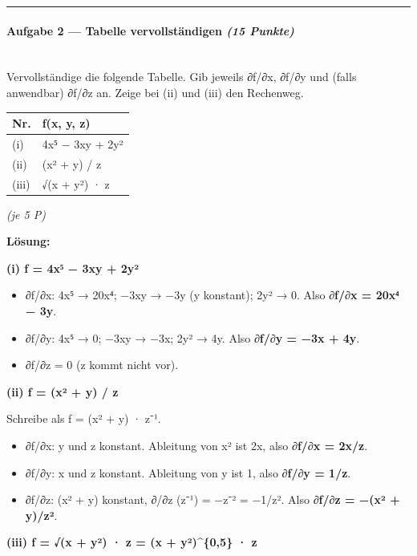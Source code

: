 \documentclass[11pt, a4paper]{article}
\begin{document}
\noindent\textcolor{rulegray}{\rule{\linewidth}{0.4pt}}


\paragraph{Aufgabe 2 — Tabelle vervollständigen \textit{(15 Punkte)}}\mbox{}\\[2pt]

Vervollständige die folgende Tabelle. Gib jeweils ∂f/∂x, ∂f/∂y und (falls anwendbar) ∂f/∂z an. Zeige bei (ii) und (iii) den Rechenweg.



{\small
\begin{tabularx}{\linewidth}{XX}
\hline
\rowcolor{tableheadbg}
{\color{white}\textbf{Nr.}} & {\color{white}\textbf{f(x, y, z)}} \\[2pt]
\hline
\endhead
\hline
\endfoot
(i) & 4x⁵ − 3xy + 2y² \\
(ii) & (x² + y) / z \\
(iii) & √(x + y²) · z \\
\end{tabularx}
}


\textit{(je 5 P)}


\textbf{Lösung:}


\textbf{(i) f = 4x⁵ − 3xy + 2y²}


\begin{itemize}
  \item ∂f/∂x: 4x⁵ → 20x⁴; −3xy → −3y (y konstant); 2y² → 0. Also \textbf{∂f/∂x = 20x⁴ − 3y}.
  \item ∂f/∂y: 4x⁵ → 0; −3xy → −3x; 2y² → 4y. Also \textbf{∂f/∂y = −3x + 4y}.
  \item ∂f/∂z = 0 (z kommt nicht vor).
\end{itemize}

\textbf{(ii) f = (x² + y) / z}


Schreibe als f = (x² + y) · z⁻¹.


\begin{itemize}
  \item ∂f/∂x: y und z konstant. Ableitung von x² ist 2x, also \textbf{∂f/∂x = 2x/z}.
  \item ∂f/∂y: x und z konstant. Ableitung von y ist 1, also \textbf{∂f/∂y = 1/z}.
  \item ∂f/∂z: (x² + y) konstant, ∂/∂z (z⁻¹) = −z⁻² = −1/z². Also \textbf{∂f/∂z = −(x² + y)/z²}.
\end{itemize}

\textbf{(iii) f = √(x + y²) · z = (x + y²)\textasciicircum{}\{0,5\} · z}
\end{document}
